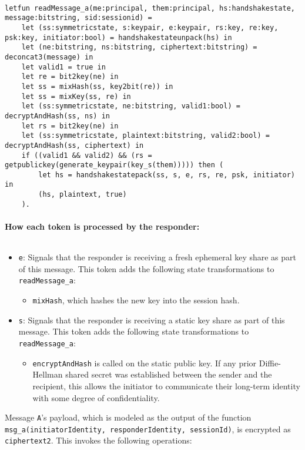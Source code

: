 \begin{lstlisting}

letfun readMessage_a(me:principal, them:principal, hs:handshakestate, message:bitstring, sid:sessionid) =
	let (ss:symmetricstate, s:keypair, e:keypair, rs:key, re:key, psk:key, initiator:bool) = handshakestateunpack(hs) in
	let (ne:bitstring, ns:bitstring, ciphertext:bitstring) = deconcat3(message) in
	let valid1 = true in
	let re = bit2key(ne) in
	let ss = mixHash(ss, key2bit(re)) in
	let ss = mixKey(ss, re) in
	let (ss:symmetricstate, ne:bitstring, valid1:bool) = decryptAndHash(ss, ns) in
	let rs = bit2key(ne) in
	let (ss:symmetricstate, plaintext:bitstring, valid2:bool) = decryptAndHash(ss, ciphertext) in
	if ((valid1 && valid2) && (rs = getpublickey(generate_keypair(key_s(them))))) then (
		let hs = handshakestatepack(ss, s, e, rs, re, psk, initiator) in
		(hs, plaintext, true)
	).

\end{lstlisting}

\paragraph{How each token is processed by the responder:}$ $

\begin{itemize}

\item \texttt{e}: Signals that the responder is receiving a fresh ephemeral key share as part of this message. This token adds the following state transformations to \texttt{readMessage\_a}:
\begin{itemize}

\item \texttt{mixHash}, which hashes the new key into the session hash.
\end{itemize}


\item \texttt{s}: Signals that the responder is receiving a static key share as part of this message. This token adds the following state transformations to \texttt{readMessage\_a}:
\begin{itemize}

\item \texttt{encryptAndHash} is called on the static public key. If any prior Diffie-Hellman shared secret was established between the sender and the recipient, this allows the initiator to communicate their long-term identity with some degree of confidentiality.
\end{itemize}


\end{itemize}
Message \texttt{A}'s payload, which is modeled as the output of the function \texttt{msg\_a(initiatorIdentity, responderIdentity, sessionId)}, is encrypted as \texttt{ciphertext2}. This invokes the following operations:


